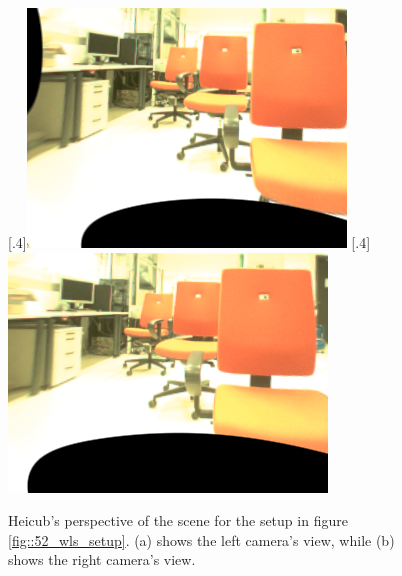 \begin{figure}[h]
	\centering
	\subcaptionbox{}%
	[.4\linewidth]{\includegraphics[scale=.3]{chapters/05_experiments/02_depth_map_parameter_tuning/l_rgb.png}}
	\subcaptionbox{}%
	[.4\linewidth]{\includegraphics[scale=.3]{chapters/05_experiments/02_depth_map_parameter_tuning/r_rgb.png}}
	\caption{Heicub's perspective of the scene for the setup in figure \ref{fig::52_wls_setup}. (a) shows the left camera's view, while (b) shows the right camera's view.}
	\label{fig::52_wls_rgb}
\end{figure}

